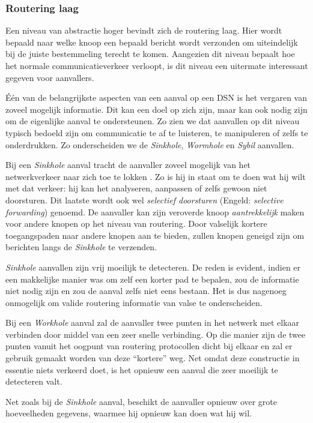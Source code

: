 \subsubsection*{Routering laag}

Een niveau van abstractie hoger bevindt zich de routering laag. Hier wordt
bepaald naar welke knoop een bepaald bericht wordt verzonden om uiteindelijk
bij de juiste bestemmeling terecht te komen. Aangezien dit niveau bepaalt hoe
het normale communicatieverkeer verloopt, is dit niveau een uitermate
interessant gegeven voor aanvallers.

\'E\'en van de belangrijkste aspecten van een aanval op een DSN is het vergaren
van zoveel mogelijk informatie. Dit kan een doel op zich zijn, maar kan ook
nodig zijn om de eigenlijke aanval te ondersteunen. Zo zien we dat aanvallen op
dit niveau typisch bedoeld zijn om communicatie te af te luisteren, te
manipuleren of zelfs te onderdrukken. Zo onderscheiden we de \emph{Sinkhole},
\emph{Wormhole} en \emph{Sybil} aanvallen.

Bij een \emph{Sinkhole} aanval tracht de aanvaller zoveel mogelijk van het
netwerkverkeer naar zich toe te lokken \cite{krontiris2008launching}. Zo is hij
in staat om te doen wat hij wilt met dat verkeer: hij kan het analyseren,
aanpassen of zelfs gewoon niet doorsturen. Dit laatste wordt ook wel
\emph{selectief doorsturen} (Engeld: \emph{selective forwarding}) genoemd. De
aanvaller kan zijn veroverde knoop \emph{aantrekkelijk} maken voor andere
knopen op het niveau van routering. Door valselijk kortere toegangspaden naar
andere knopen aan te bieden, zullen knopen geneigd zijn om berichten langs de
\emph{Sinkhole} te verzenden.

\emph{Sinkhole} aanvallen zijn vrij moeilijk te detecteren. De reden is
evident, indien er een makkelijke manier was om zelf een korter pad te bepalen,
zou de informatie niet nodig zijn en zou de aanval zelfs niet eens bestaan. Het
is dus nagenoeg onmogelijk om valide routering informatie van valse te
onderscheiden.

Bij een \emph{Workhole} aanval zal de aanvaller twee punten in het netwerk met
elkaar verbinden door middel van een zeer snelle verbinding. Op die manier zijn
de twee punten vanuit het oogpunt van routering protocollen dicht bij elkaar en
zal er gebruik gemaakt worden van deze ``kortere'' weg. Net omdat deze
constructie in essentie niets verkeerd doet, is het opnieuw een aanval die zeer
moeilijk te detecteren valt.

Net zoals bij de \emph{Sinkhole} aanval, beschikt de aanvaller opnieuw over
grote hoeveelheden gegevens, waarmee hij opnieuw kan doen wat hij wil.

